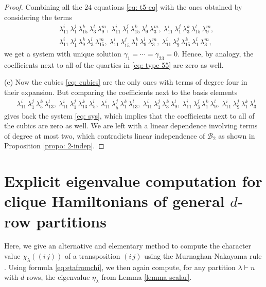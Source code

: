 \documentclass[12pt,dvipsnames,accepted=2016-08-18,a4paper,onecolumn]{quantumarticle}
\numberwithin{equation}{section}
\theoremstyle{definition}
\begin{document}
\begin{proof}
	Combining all the $24$ equations \eqref{eq: t5-eq} with the ones obtained by considering the terms
	\begin{align*}
		&\lambda_{11}^i\, \lambda_1^j\, \lambda_{15}^k\, \lambda_3^l\, \lambda_9^m,\ 
		\lambda_{11}^i\, \lambda_1^j\, \lambda_{15}^k\, \lambda_9^l\, \lambda_3^m,\ 
		\lambda_{11}^i\, \lambda_1^j\, \lambda_3^k\, \lambda_{15}^l\, \lambda_9^m,\\
		&\lambda_{11}^i\, \lambda_1^j\, \lambda_9^k\, \lambda_3^l\, \lambda_{15}^m,\ 
		\lambda_{11}^i\, \lambda_{15}^j\, \lambda_1^k\, \lambda_9^l\, \lambda_3^m,\ 
		\lambda_{11}^i\, \lambda_9^j\, \lambda_{15}^k\, \lambda_1^l\, \lambda_3^m,
	\end{align*}
	we get a system with unique solution $\gamma_1=\cdots= \gamma_{23}=0$. Hence, by analogy, the coefficients next to all of the quartics in \eqref{eq: type 55} are zero as well.
	
	(e) Now the cubics \eqref{eq: cubics} are the only ones with terms of degree four in their expansion. But comparing the coefficients next to the basis elements 
	\begin{align*}
		&\lambda_{11}^i\, \lambda_1^j\, \lambda_5^k\, \lambda_{13}^l, \ \lambda_{11}^i\,\lambda_1^j\, \lambda_{13}^k\, \lambda_5^l,\
		\lambda_{11}^i\, \lambda_5^j\, \lambda_1^k\, \lambda_{13}^l,\ 
		\lambda_{11}^i\, \lambda_1^j\, \lambda_3^k\, \lambda_9^l,\ 
		\lambda_{11}^i\, \lambda_3^j\, \lambda_1^k\, \lambda_9^l,\ 
		\lambda_{11}^i\, \lambda_9^j\, \lambda_1^k\, \lambda_3^l
	\end{align*}
	 gives back the system \eqref{eq: sys}, which implies that the coefficients next to all of the cubics are zero as well.
	We are left with a linear dependence involving terms of degree at most two, which contradicts linear independence of $\mathcal{B}_2$ as shown in Proposition \ref{propo: 2-indep}.
\end{proof}





\section{Explicit eigenvalue computation for clique Hamiltonians of general $d$-row partitions}\label{appC}



Here, we give an alternative and elementary method to compute the character value $\chi_\lambda ((i\,j))$ of a transposition $(i \,j)$ using the Murnaghan-Nakayama rule \cite[Section 9.9.1]{Probook}. Using formula \eqref{eq:etafromchi}, we then again compute, for any partition $\lambda \vdash n$ with $d$ rows, 
 the eigenvalue $\eta_\lambda$ from  Lemma \ref{lemma scalar}.
\end{document}

